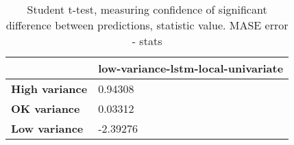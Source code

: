 \begin{table}[h]
\centering
\caption{Student t-test, measuring confidence of significant difference between predictions, statistic value. MASE error - stats}
\label{table:ttest-stats-variance-experiments-MASE}
\begin{tabular}{ll}
\toprule
{} & low-variance-lstm-local-univariate \\
\midrule
\textbf{High variance} &                            0.94308 \\
\textbf{OK variance  } &                            0.03312 \\
\textbf{Low variance } &                           -2.39276 \\
\bottomrule
\end{tabular}
\end{table}
